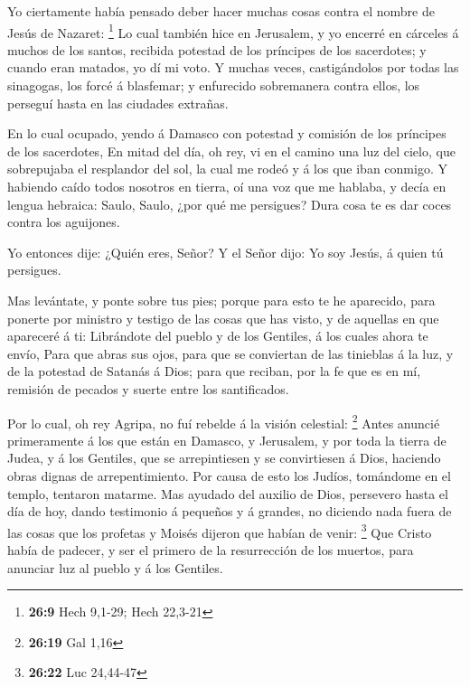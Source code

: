  Yo ciertamente había pensado deber hacer muchas cosas
contra el nombre de Jesús de Nazaret: \footnote{\textbf{26:9} Hech
  9,1-29; Hech 22,3-21}  Lo cual también hice en
Jerusalem, y yo encerré en cárceles á muchos de los santos, recibida
potestad de los príncipes de los sacerdotes; y cuando eran matados, yo
dí mi voto.  Y muchas veces, castigándolos por todas las
sinagogas, los forcé á blasfemar; y enfurecido sobremanera contra ellos,
los perseguí hasta en las ciudades extrañas.

 En lo cual ocupado, yendo á Damasco con potestad y
comisión de los príncipes de los sacerdotes,  En mitad
del día, oh rey, vi en el camino una luz del cielo, que sobrepujaba el
resplandor del sol, la cual me rodeó y á los que iban conmigo.
 Y habiendo caído todos nosotros en tierra, oí una voz
que me hablaba, y decía en lengua hebraica: Saulo, Saulo, ¿por qué me
persigues? Dura cosa te es dar coces contra los aguijones.

 Yo entonces dije: ¿Quién eres, Señor? Y el Señor dijo:
Yo soy Jesús, á quien tú persigues.

 Mas levántate, y ponte sobre tus pies; porque para esto
te he aparecido, para ponerte por ministro y testigo de las cosas que
has visto, y de aquellas en que apareceré á ti: 
Librándote del pueblo y de los Gentiles, á los cuales ahora te envío,
 Para que abras sus ojos, para que se conviertan de las
tinieblas á la luz, y de la potestad de Satanás á Dios; para que
reciban, por la fe que es en mí, remisión de pecados y suerte entre los
santificados.

 Por lo cual, oh rey Agripa, no fuí rebelde á la visión
celestial: \footnote{\textbf{26:19} Gal 1,16}  Antes
anuncié primeramente á los que están en Damasco, y Jerusalem, y por toda
la tierra de Judea, y á los Gentiles, que se arrepintiesen y se
convirtiesen á Dios, haciendo obras dignas de arrepentimiento.
 Por causa de esto los Judíos, tomándome en el templo,
tentaron matarme.  Mas ayudado del auxilio de Dios,
persevero hasta el día de hoy, dando testimonio á pequeños y á grandes,
no diciendo nada fuera de las cosas que los profetas y Moisés dijeron
que habían de venir: \footnote{\textbf{26:22} Luc 24,44-47}
 Que Cristo había de padecer, y ser el primero de la
resurrección de los muertos, para anunciar luz al pueblo y á los
Gentiles.

